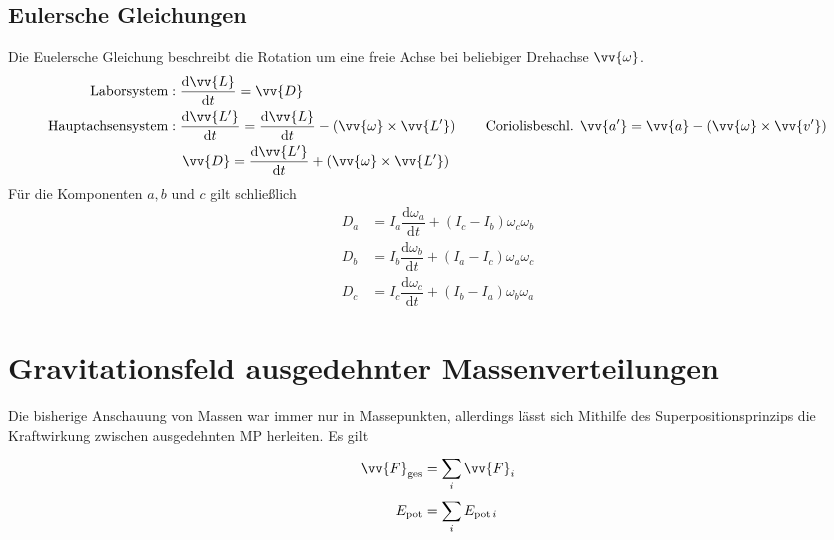 \documentclass[a4paper,12pt]{article}
\numberwithin{equation}{section}
\begin{document}
\subsection{Eulersche Gleichungen}
Die Euelersche Gleichung beschreibt die Rotation um eine freie Achse bei beliebiger Drehachse $\vv{\omega }$.
\begin{align*} %
        \text{Laborsystem}&:\dfrac{\text{d}\vv{L}}{\text{d}t}=\vv{D}\\
        \text{Hauptachsensystem}&:\dfrac{\text{d}\vv{L'}}{\text{d}t}=\dfrac{\text{d}\vv{L}}{\text{d}t}-\left(\vv{\omega }\times \vv{L'}\right)\qquad \text{Coriolisbeschl. }\vv{a'}=\vv{a}-\left(\vv{\omega }\times \vv{v'}\right)\\
                                &\quad \vv{D}=\dfrac{\text{d}\vv{L'}}{\text{d}t}+\left(\vv{\omega }\times \vv{L'}\right)
\end{align*}
Für die Komponenten $a,b$ und $c$ gilt schließlich
\begin{align*} %
        D_a&=I_a\dfrac{\text{d}\omega _a}{\text{d}t}+\left(I_c-I_b\right)\omega _c\omega _b\\
        D_b&=I_b\dfrac{\text{d}\omega _b}{\text{d}t}+\left(I_a-I_c\right)\omega _a\omega _c\\
        D_c&=I_c\dfrac{\text{d}\omega _c}{\text{d}t}+\left(I_b-I_a\right)\omega _b\omega _a
\end{align*}

\section{Gravitationsfeld ausgedehnter Massenverteilungen}
Die bisherige Anschauung von Massen war immer nur in Massepunkten, allerdings lässt sich Mithilfe des Superpositionsprinzips die Kraftwirkung zwischen ausgedehnten MP herleiten. Es gilt
\begin{align*}
        \vv{F}_{\text{ges}}&=\sum_{i}^{}\vv{F}_i\\
        E_{\text{pot}}&=\sum_{i}^{}E_{\text{pot}\,i}
\end{align*}
\end{document}
